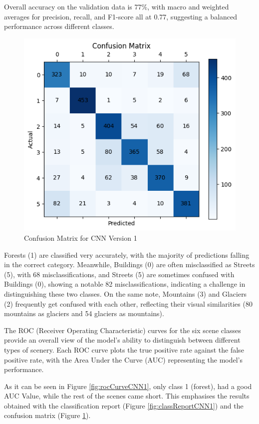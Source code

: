 \documentclass[conference]{IEEEtran}
\begin{document}
Overall accuracy on the validation data is 77\%, with macro and weighted averages for precision, recall, and F1-score all at 0.77, suggesting a balanced performance across different classes.

\begin{figure}[H]
    \centering
    \includegraphics[width=0.9\linewidth]{images/confusion_matrix_cnn_1.png}
    \caption{Confusion Matrix for CNN Version 1}
    \label{fig:confusionMatrixCNN1}
\end{figure}

Forests (1) are classified very accurately, with the majority of predictions falling in the correct category. Meanwhile, Buildings (0) are often misclassified as Streets (5), with 68 misclassifications, and Streets (5) are sometimes confused with Buildings (0), showing a notable 82 misclassifications, indicating a challenge in distinguishing these two classes. On the same note, Mountains (3) and Glaciers (2) frequently get confused with each other, reflecting their visual similarities (80 mountains as glaciers and 54 glaciers as mountains).

The ROC (Receiver Operating Characteristic) curves for the six scene classes provide an overall view of the model's ability to distinguish between different types of scenery. Each ROC curve plots the true positive rate against the false positive rate, with the Area Under the Curve (AUC) representing the model's performance.

As it can be seen in Figure \ref{fig:rocCurveCNN1}, only class 1 (forest), had a good AUC Value, while the rest of the scenes came short. This emphasises the results obtained with the classification report (Figure \ref{fig:classReportCNN1}) and the confusion matrix (Figure \ref{fig:confusionMatrixCNN1}).
\end{document}
